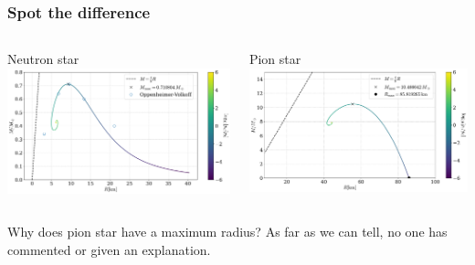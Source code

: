 \documentclass[aspectratio=169]{beamer}
\begin{document}
    \begin{frame}
        \frametitle{Spot the difference}
        \begin{columns}
            \begin{column}{0.5\textwidth}
                Neutron star
                \includegraphics[width=\textwidth]{../../scripts/figurer/mass_radius_neutron.pdf}
            \end{column}
            \begin{column}{0.5\textwidth}
                Pion star
                \includegraphics[width=\textwidth]{../../scripts/figurer/pion_star/mass_radius_pion_star.pdf}
            \end{column}
        \end{columns}
        Why does pion star have a maximum radius? As far as we can tell, no one has commented or given an explanation.
    \end{frame}
\end{document}
